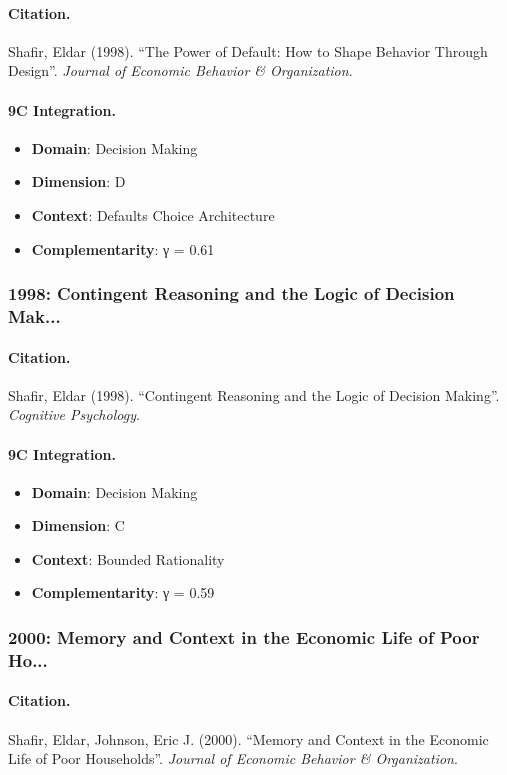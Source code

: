 \paragraph{Citation.}
Shafir, Eldar (1998). ``The Power of Default: How to Shape Behavior Through Design''. \textit{Journal of Economic Behavior & Organization}.

\paragraph{9C Integration.}
\begin{itemize}[nosep]
  \item \textbf{Domain}: Decision Making
  \item \textbf{Dimension}: D
  \item \textbf{Context}: Defaults Choice Architecture
  \item \textbf{Complementarity}: γ = 0.61
\end{itemize}


\subsubsection{1998: Contingent Reasoning and the Logic of Decision Mak...}

\paragraph{Citation.}
Shafir, Eldar (1998). ``Contingent Reasoning and the Logic of Decision Making''. \textit{Cognitive Psychology}.

\paragraph{9C Integration.}
\begin{itemize}[nosep]
  \item \textbf{Domain}: Decision Making
  \item \textbf{Dimension}: C
  \item \textbf{Context}: Bounded Rationality
  \item \textbf{Complementarity}: γ = 0.59
\end{itemize}


\subsubsection{2000: Memory and Context in the Economic Life of Poor Ho...}

\paragraph{Citation.}
Shafir, Eldar, Johnson, Eric J. (2000). ``Memory and Context in the Economic Life of Poor Households''. \textit{Journal of Economic Behavior & Organization}.

